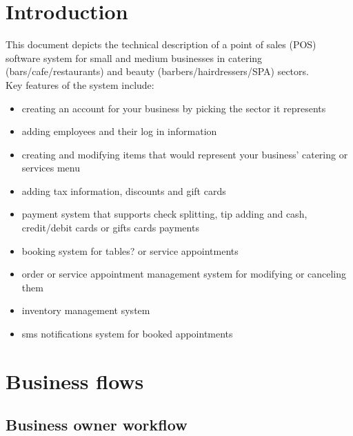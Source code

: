 \documentclass{article}
\begin{document}
    
    \newpage
    
    \section{Introduction}
    This document depicts the technical description of a point of sales (POS) software system for small and medium businesses in catering (bars/cafe/restaurants) and beauty (barbers/hairdressers/SPA) sectors.\\[0.2cm] Key features of the system include:
    \begin{itemize}
        \item creating an account for your business by picking the sector it represents
        \item adding employees and their log in information 
        \item creating and modifying items that would represent your business' catering or services menu
        \item adding tax information, discounts and gift cards
        \item payment system that supports check splitting, tip adding and cash, credit/debit cards or gifts cards payments
        \item booking system for tables? or service appointments
        \item order or service appointment management system for modifying or canceling them
        \item inventory management system
        \item sms notifications system for booked appointments
    \end{itemize}

    \section{Business flows}
    \subsection{Business owner workflow}
\end{document}
